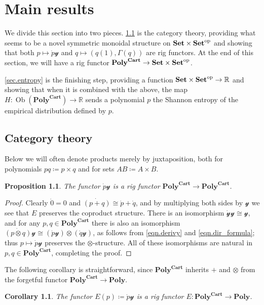 \documentclass[11pt, one side, article]{memoir}
\theoremstyle{definition}
\theoremstyle{plain}
\newtheorem{proposition}[definitionx]{Proposition}
\newtheorem{corollary}[definitionx]{Corollary}
\DeclareMathOperator{\ob}{Ob}
\newcommand{\Cat}[1]{\mathbf{#1}}%
\newcommand{\op}{^\tn{op}}
\newcommand{\tn}[1]{\textnormal{#1}}
\newcommand{\rr}{\mathbb{R}}
\newcommand{\smset}{\Cat{Set}}
\newcommand{\yon}{\mathcal{y}}
\newcommand{\poly}{\Cat{Poly}}
\newcommand{\polycart}{\poly^{\Cat{Cart}}}
\newcommand{\0}{\textsf{0}}
\newcommand{\1}{\tn{\textsf{1}}}
\begin{document}
\chapter{Main results}

We divide this section into two pieces. \cref{sec.CT} is the category theory, providing what seems to be a novel symmetric monoidal structure on $\smset\times\smset\op$ and showing that both $p\mapsto\dot{p}\yon$ and $q\mapsto(q(1),\Gamma(q))$ are rig functors. At the end of this section, we will have a rig functor $\polycart\to\smset\times\smset\op$.

\cref{sec.entropy} is the finishing step, providing a function $\smset\times\smset\op\to\rr$ and showing that when it is combined with the above, the map $H\colon\ob(\polycart)\to\rr$ sends a polynomial $p$ the Shannon entropy of the empirical distribution defined by $p$.

\section{Category theory}\label{sec.CT}

Below we will often denote products merely by juxtaposition, both for polynomials $pq\coloneqq p\times q$ and for sets $AB\coloneqq A\times B$.

\begin{proposition}
The functor $\dot{p}\yon$ is a rig functor $\polycart\to\polycart$. 
\end{proposition}
\begin{proof}
Clearly $\dot{0}=0$ and $\dot{(p+q)}\cong\dot{p}+\dot{q}$, and by multiplying both sides by $\yon$ we see that $E$ preserves the coproduct structure. There is an isomorphism $\dot{\yon}\yon\cong\yon$, and for any $p,q\in\polycart$ there is also an isomorphism $\dot{(p\otimes q)}\yon\cong(\dot{p}\yon)\otimes(\dot{q}\yon)$, as follows from \eqref{eqn.derivy} and \eqref{eqn.dir_formula}; thus $p\mapsto\dot{p}\yon$ preserves the $\otimes$-structure. All of these isomorphisms are natural in $p,q\in\polycart$, completing the proof.
\end{proof}

The following corollary is straightforward, since $\polycart$ inherits $+$ and $\otimes$ from the forgetful functor $\polycart\to\poly$.

\begin{corollary}\label{cor.E}
The functor $E(p)\coloneqq\dot{p}\yon$ is a rig functor $E\colon\polycart\to\poly$. 
\end{corollary}
\end{document}
